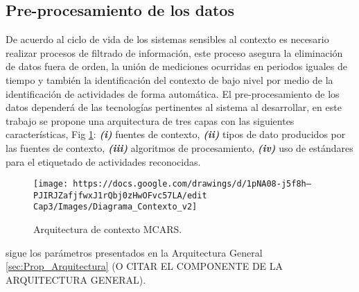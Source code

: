 \subsection{Pre-procesamiento de los datos}
\label{subsubsec:Prop_Adqui_PrePro}

De acuerdo al ciclo de vida de los sistemas sensibles al contexto es necesario realizar procesos de filtrado de información, este proceso asegura la eliminación de datos fuera de orden, la unión de mediciones ocurridas en periodos iguales de tiempo y también la identificación del contexto de bajo nivel por medio de la identificación de actividades de forma automática.
El pre-procesamiento de los datos dependerá de las tecnologías pertinentes al sistema al desarrollar, en este trabajo se propone una arquitectura de tres capas con las siguientes características, Fig  \ref{fig:Diagrama_preprocesa}:
\textbf{\textit{(i)}} fuentes de contexto, 
\textbf{\textit{(ii)}} tipos de dato producidos por las fuentes de contexto,
\textbf{\textit{(iii)}} algoritmos de procesamiento,
\textbf{\textit{(iv)}} uso de estándares para el etiquetado de actividades reconocidas.
\begin{figure}[ht]
    \centering%
    \texttt{[image: https://docs.google.com/drawings/d/1pNA08-j5f8h--PJIRJZafjfwxJ1rQbj0zHwOFvc57LA/edit     Cap3/Images/Diagrama\_Contexto\_v2]}%
    \caption{Arquitectura de contexto MCARS.} \label{fig:Diagrama_preprocesa}
\end{figure}
    


sigue los parámetros presentados en la Arquitectura General \ref{sec:Prop_Arquitectura} (O CITAR EL COMPONENTE DE LA ARQUITECTURA GENERAL).
